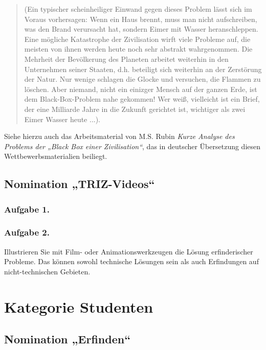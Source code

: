 \documentclass[11pt,a4paper]{article}
\begin{document}
{\begin{quote}
(Ein typischer scheinheiliger Einwand gegen dieses Problem lässt sich im
Voraus vorhersagen: Wenn ein Haus brennt, muss man nicht aufschreiben, was den
Brand verursacht hat, sondern Eimer mit Wasser heranschleppen. Eine mögliche
Katastrophe der Zivilisation wirft viele Probleme auf, die meisten von ihnen
werden heute noch sehr abstrakt wahrgenommen. Die Mehrheit der Bevölkerung des
Planeten arbeitet weiterhin in den Unternehmen seiner Staaten, d.h. beteiligt
sich weiterhin an der Zerstörung der Natur. Nur wenige schlagen die Glocke und
versuchen, die Flammen zu löschen. Aber niemand, nicht ein einizger Mensch auf
der ganzen Erde, ist dem Black-Box-Problem nahe gekommen! Wer weiß, vielleicht
ist ein Brief, der eine Milliarde Jahre in die Zukunft gerichtet ist,
wichtiger als zwei Eimer Wasser heute ...).
  \end{quote}

Siehe hierzu auch das Arbeitsmaterial von M.S. Rubin \emph{Kurze Analyse des
  Problems der „Black Box einer Zivilisation“}, das in deutscher Übersetzung
diesen Wettbewerbsmaterialien beiliegt.
}

\BlackBoxOfCivilization

\subsection{Nomination „TRIZ-Videos“}

\newcommand{\VideoThree}{Illustrieren Sie mit Film- oder Animationswerkzeugen
  die Lösung erfinderischer Probleme. Das können sowohl technische Lösungen
  sein als auch Erfindungen auf nicht-technischen Gebieten. }

\subsubsection*{Aufgabe 1.}\VideoOne
\subsubsection*{Aufgabe 2.}\VideoThree

\GeneralText
\clearpage

\section{Kategorie Studenten}

\subsection{Nomination „Erfinden“}
\end{document}
